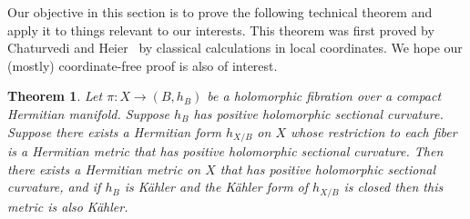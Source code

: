 \documentclass[10pt,a4paper]{amsart}
\newtheorem{theo}{Theorem}[section]
\theoremstyle{definition}
\begin{document}
Our objective in this section is to prove the following technical theorem and apply it to things relevant to our interests.
This theorem was first proved by Chaturvedi and Heier~\cite[Theorem~1.1]{chaturvedi2020hermitian} by classical calculations in local coordinates.
We hope our (mostly) coordinate-free proof is also of interest.

\begin{theo}
\label{thm:holomorphic-sectional-positive}
Let $\pi : X \to (B,h_{B})$ be a holomorphic fibration over a compact Hermitian manifold.
Suppose $h_{B}$ has positive holomorphic sectional curvature.
Suppose there exists a Hermitian form $h_{X/B}$ on $X$ whose restriction to each fiber is a Hermitian metric that has positive holomorphic sectional curvature.
Then there exists a Hermitian metric on $X$ that has positive holomorphic sectional curvature, and if $h_{B}$ is K\"ahler and the K\"ahler form of $h_{X/B}$ is closed then this metric is also K\"ahler.
\end{theo}
\end{document}
